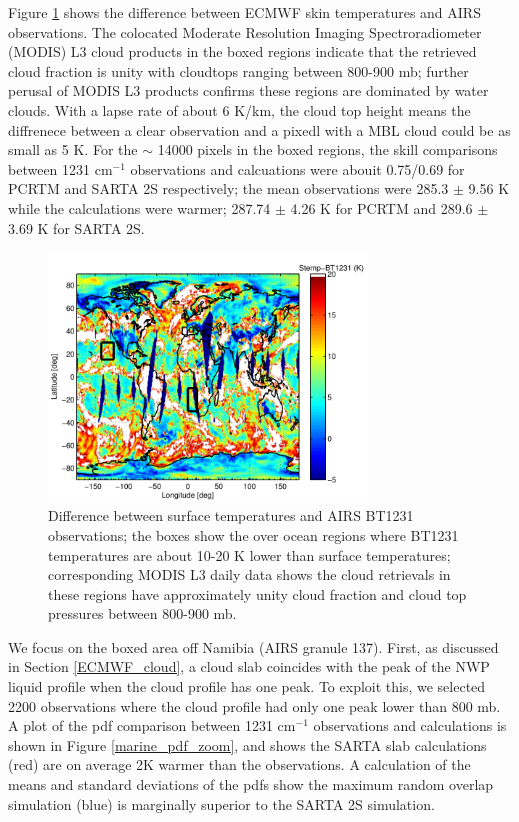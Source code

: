 \documentclass[agupp]{aguplus}              %
\newcommand{\wn}{cm$^{-1}$\xspace}
\begin{document}
\begin{article}
Figure \ref{marine_clouds} shows the difference between ECMWF skin
temperatures and AIRS observations.  The colocated Moderate Resolution
Imaging Spectroradiometer (MODIS) L3 cloud products in the boxed
regions indicate that the retrieved cloud fraction is unity with cloudtops
ranging between 800-900 mb; further perusal of MODIS L3 products
confirms these regions are dominated by water clouds. With a lapse
rate of about 6 K/km, the cloud top height means the diffrenece
between a clear observation and a pixedl with a MBL cloud could be as
small as 5 K. For the $\sim$ 14000 pixels in the boxed regions, the
skill comparisons between 1231 \wn observations and calcuations were
abouit 0.75/0.69 for PCRTM and SARTA 2S respectively; the mean
observations were 285.3 $\pm$ 9.56 K while the calculations were
warmer; 287.74 $\pm$ 4.26 K for PCRTM and 289.6 $\pm$ 3.69 K for SARTA
2S.

\begin{figure}[h]
\noindent\includegraphics[width=20pc]{FIGS/marine_obs}
\caption{Difference between surface temperatures and AIRS BT1231 observations;
the boxes show the over ocean regions where BT1231 temperatures are
about 10-20 K lower than surface temperatures; corresponding MODIS L3
daily data shows the cloud retrievals in these regions have
approximately unity cloud fraction and cloud top pressures between
800-900 mb.  } 
\label{marine_clouds} \end{figure}

We focus on the boxed area off Namibia (AIRS granule 137). First, as
discussed in Section \ref{ECMWF_cloud}, a cloud slab coincides with
the peak of the NWP liquid profile when the cloud profile has one
peak. To exploit this, we selected 2200 observations where the cloud
profile had only one peak lower than 800 mb. A plot of the pdf
comparison between 1231 \wn observations and calculations is shown in
Figure \ref{marine_pdf_zoom}, and shows the SARTA slab calculations
(red) are on average 2K warmer than the observations. A calculation of
the means and standard deviations of the pdfs show the maximum random
overlap simulation (blue) is marginally superior to the SARTA 2S
simulation.


\end{article}
\end{document}
